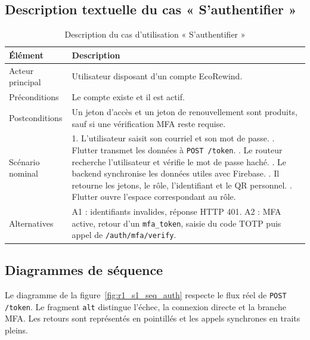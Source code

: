 \label{fig:r1_s1_uc}

\subsection{Description textuelle du cas « S'authentifier »}

\begin{longtable}{|p{3.2cm}|p{10.2cm}|}
\caption{Description du cas d'utilisation « S'authentifier »}\label{tab:r1_uc_auth}\\
\hline\rowcolor{gray!20}\textbf{Élément} & \textbf{Description}\\\hline
Acteur principal & Utilisateur disposant d'un compte EcoRewind.\\\hline
Préconditions & Le compte existe et il est actif.\\\hline
Postconditions & Un jeton d'accès et un jeton de renouvellement sont produits, sauf si une vérification MFA reste requise.\\\hline
Scénario nominal & 1. L'utilisateur saisit son courriel et son mot de passe. \newline 2. Flutter transmet les données à \texttt{POST /token}. \newline 3. Le routeur recherche l'utilisateur et vérifie le mot de passe haché. \newline 4. Le backend synchronise les données utiles avec Firebase. \newline 5. Il retourne les jetons, le rôle, l'identifiant et le QR personnel. \newline 6. Flutter ouvre l'espace correspondant au rôle.\\\hline
Alternatives & A1 : identifiants invalides, réponse HTTP 401. \newline A2 : MFA active, retour d'un \texttt{mfa\_token}, saisie du code TOTP puis appel de \texttt{/auth/mfa/verify}.\\\hline
\end{longtable}

\subsection{Diagrammes de séquence}

Le diagramme de la figure~\ref{fig:r1_s1_seq_auth} respecte le flux réel de \texttt{POST /token}. Le fragment \texttt{alt} distingue l'échec, la connexion directe et la branche MFA. Les retours sont représentés en pointillés et les appels synchrones en traits pleins.

